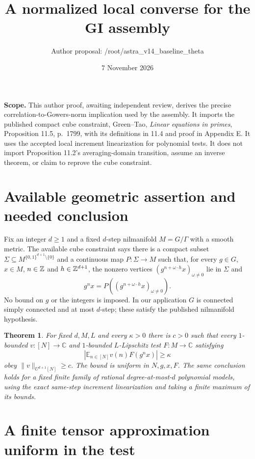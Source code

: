 \documentclass[11pt]{article}
\title{A normalized local converse for the GI assembly}
\author{Author proposal: /root/astra\_v14\_baseline\_theta}
\date{7 November 2026}
\newtheorem{theorem}{Theorem}\newtheorem{lemma}[theorem]{Lemma}
\newcommand{\C}{\mathbb C}\newcommand{\E}{\mathbb E}
\begin{document}
\maketitle

\noindent\textbf{Scope.} This author proof, awaiting independent review,
derives the precise correlation-to-Gowers-norm implication used by the
assembly. It imports the published compact cube constraint, Green--Tao,
\emph{Linear equations in primes}, Proposition 11.5, p.~1799, with its
definitions in 11.4 and proof in Appendix E. It uses the accepted local
increment linearization for polynomial tests. It does not import
Proposition 11.2's averaging-domain transition, assume an inverse
theorem, or claim to reprove the cube constraint.

\section{Available geometric assertion and needed conclusion}

Fix an integer $d\geq1$ and a fixed $d$-step nilmanifold $M=G/\Gamma$
with a smooth metric. The available cube constraint says there is a
compact subset
$\Sigma\subseteq M^{\{0,1\}^{d+1}\setminus\{0\}}$ and a continuous
map $P:\Sigma\to M$ such that, for every $g\in G$, $x\in M$,
$n\in\mathbb Z$ and $h\in\mathbb Z^{d+1}$, the nonzero vertices
$(g^{n+\omega\cdot h}x)_{\omega\ne0}$ lie in $\Sigma$ and
\[
 g^nx=P((g^{n+\omega\cdot h}x)_{\omega\ne0}).
\]
No bound on $g$ or the integers is imposed. In our application $G$ is
connected simply connected and at most $d$-step; these satisfy the
published nilmanifold hypothesis.

\begin{theorem}\label{thm:converse}
For fixed $d,M,L$ and every $\kappa>0$ there is $c>0$ such that
every $1$-bounded $v:[N]\to\C$ and $1$-bounded $L$-Lipschitz test
$F:M\to\C$ satisfying
\[
 |\E_{n\in[N]}v(n)F(g^nx)|\geq\kappa
\]
obey $\|v\|_{U^{d+1}[N]}\geq c$. The bound is uniform in $N,g,x,F$.
The same conclusion holds for a fixed finite family of rational
degree-at-most-$d$ polynomial models, using the exact same-step
increment linearization and taking a finite maximum of its bounds.
\end{theorem}

\section{A finite tensor approximation uniform in the test}
\end{document}

